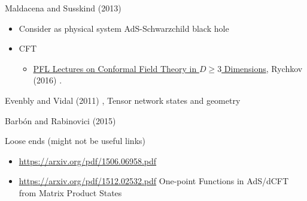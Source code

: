 \documentclass[10pt, twoside]{amsart}
\begin{document}
\begin{multicols*}{2}
Maldacena and Susskind (2013) \cite{MaSu2013}  


\begin{itemize}
\item Consider as physical system AdS-Schwarzchild black hole   
\item CFT 
\begin{itemize}
\item \href{https://arxiv.org/pdf/1601.05000.pdf}{PFL Lectures on Conformal Field Theory in $D\geq 3$ Dimensions}, Rychkov (2016) \cite{Rych2016}.  
\end{itemize}
\end{itemize}


Evenbly and Vidal (2011) \cite{EvVi2011}, Tensor network states and geometry

Barb\'{o}n and Rabinovici (2015) \cite{BaRa2015}  

Loose ends (might not be useful links)
\begin{itemize}
\item \url{https://arxiv.org/pdf/1506.06958.pdf}
\item \url{https://arxiv.org/pdf/1512.02532.pdf} One-point Functions in AdS/dCFT from Matrix Product States
\end{itemize}

\end{multicols*}
\end{document}
